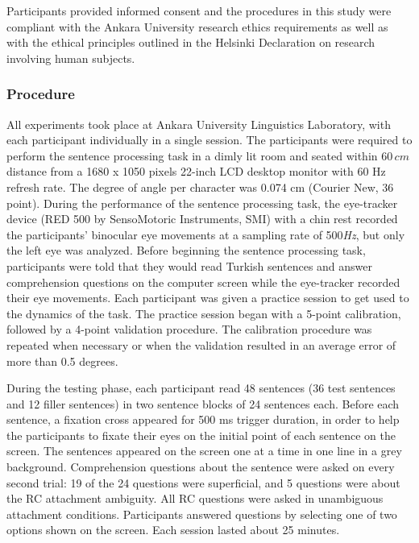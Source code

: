 \documentclass[english, doc]{apa7}\usepackage[]{graphicx}\usepackage[]{color}
\begin{document}
Participants provided informed consent and the procedures in this study were compliant with the Ankara University research ethics requirements as well as with the ethical principles outlined in the Helsinki Declaration on research involving human subjects.

\subsubsection{Procedure}

All experiments took place at Ankara University Linguistics Laboratory, with each participant individually in a single session. The participants were required to perform the sentence processing task in a dimly lit room and seated within $60\,cm$ distance from a 1680 x 1050 pixels 22-inch LCD desktop monitor with 60 Hz refresh rate. The degree of angle per character was 0.074 cm (Courier New, 36 point). During the performance of the sentence processing task, the eye-tracker device (RED 500 by SensoMotoric Instruments, SMI) with a chin rest recorded the participants' binocular eye movements at a sampling rate of 500\emph{Hz}, but only the left eye was analyzed. 
%
Before beginning the sentence processing task, participants were told that they would read Turkish sentences and answer comprehension questions on the computer screen while the eye-tracker recorded their eye movements. 
Each participant was given a practice session to get used to the dynamics of the task. The practice session began with a 5-point calibration, followed by a 4-point validation procedure. The calibration procedure was repeated when necessary or when the validation resulted in an average error of more than 0.5 degrees.

During the testing phase, each participant read 48 sentences (36 test sentences and 12 filler sentences) in two sentence blocks of 24 sentences each. Before each sentence, a fixation cross appeared for 500 ms trigger duration, in order to help the participants to fixate their eyes on the initial point of each sentence on the screen. The sentences appeared on the screen one at a time in one line in a grey background. 
%
Comprehension questions about the sentence were asked on every second trial: 19 of the 24 questions were superficial, and 5 questions were about the RC attachment ambiguity. All RC questions were asked in unambiguous attachment conditions. Participants answered questions by selecting one of two options shown on the screen. Each session lasted about 25 minutes.
\end{document}
